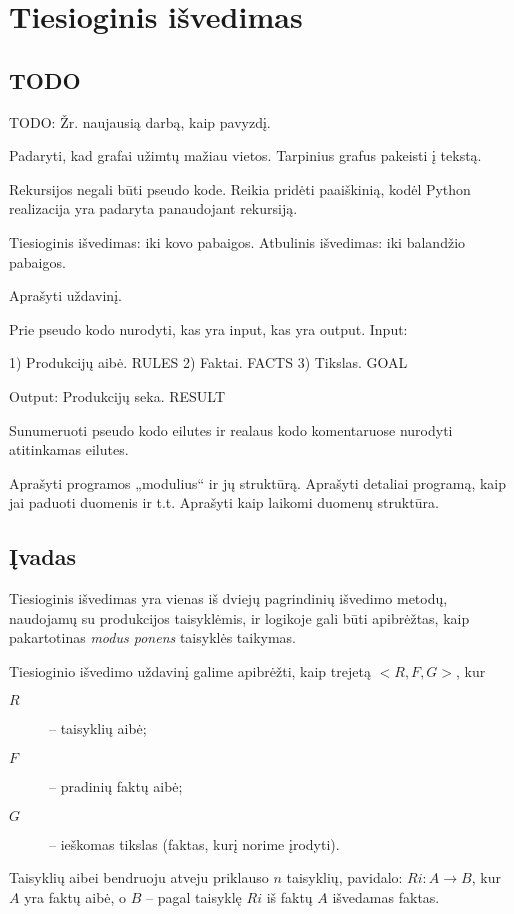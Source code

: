 \chapter{Tiesioginis išvedimas}

\section{TODO}


TODO: Žr. naujausią darbą, kaip pavyzdį.

Padaryti, kad grafai užimtų mažiau vietos. Tarpinius grafus pakeisti
į tekstą.

Rekursijos negali būti pseudo kode. Reikia pridėti paaiškinią, kodėl
Python realizacija yra padaryta panaudojant rekursiją.

Tiesioginis išvedimas: iki kovo pabaigos.
Atbulinis išvedimas: iki balandžio pabaigos.

Aprašyti uždavinį.

Prie pseudo kodo nurodyti, kas yra input, kas yra output.
Input:

1)  Produkcijų aibė. RULES
2)  Faktai. FACTS
3)  Tikslas. GOAL

Output: Produkcijų seka. RESULT

Sunumeruoti pseudo kodo eilutes ir realaus kodo komentaruose
nurodyti atitinkamas eilutes.

Aprašyti programos „modulius“ ir jų struktūrą. Aprašyti detaliai
programą, kaip jai paduoti duomenis ir t.t.
Aprašyti kaip laikomi duomenų struktūra.

\section{Įvadas}

Tiesioginis išvedimas yra vienas iš dviejų pagrindinių išvedimo metodų,
naudojamų su produkcijos taisyklėmis, ir logikoje gali būti
apibrėžtas, kaip pakartotinas \emph{modus ponens} taisyklės
taikymas.

Tiesioginio išvedimo uždavinį galime apibrėžti, kaip trejetą
$<R, F, G>$, kur
\begin{description}
  \item[$R$] – taisyklių aibė;
  \item[$F$] – pradinių faktų aibė;
  \item[$G$] – ieškomas tikslas (faktas, kurį norime įrodyti).
\end{description}
Taisyklių aibei bendruoju atveju priklauso $n$ taisyklių, pavidalo:
$Ri: A \to B$, kur $A$ yra faktų aibė, o $B$ – pagal taisyklę
$Ri$ iš faktų $A$ išvedamas faktas.

